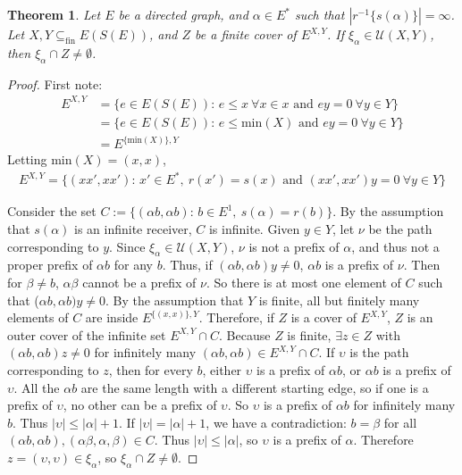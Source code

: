 \documentclass{article}
\newtheorem*{theorem}{Theorem}
\begin{document}
\begin{theorem} Let $E$ be a directed graph, and $\alpha \in E^*$ such that $|r^{-1}\{s(\alpha)\}| = \infty$.
    Let $X, Y \subseteq_{\text{fin}} E(S(E))$, and $Z$ be a finite cover of $E^{X, Y}$.
If $\xi_\alpha \in \mathcal{U}(X, Y)$, then $\xi_\alpha \cap Z \neq \emptyset$. \end{theorem}
\begin{proof}
    First note:
    \begin{align*}
        E^{X, Y} &= \{ e \in E(S(E))\text{: } e \leq x \ \forall x \in x \text{ and } ey = 0 \ \forall y \in Y \} \\
                 &= \{ e \in E(S(E))\text{: } e \leq \text{min}(X) \text{ and } ey = 0 \ \forall y \in Y \} \\
                 &= E^{\{\text{min}(X)\}, Y}
    \end{align*}
    Letting min$(X) = (x, x)$,
    \begin{align*}
        E^{X, Y} = \{ (xx', xx') \text{: } x' \in E^*, \ r(x') = s(x) \text{ and } (xx', xx')y = 0 \ \forall y \in Y \}
    \end{align*}

    Consider the set $C := \{ (\alpha b, \alpha b)\text{: } b \in E^1, \ s(\alpha) = r(b) \}$. By the assumption
    that $s(\alpha)$ is an infinite receiver, $C$ is infinite. Given $y \in Y$, let $\nu$ be the path corresponding to $y$.
    Since $\xi_\alpha \in \mathcal{U}(X, Y)$, $\nu$ is not a prefix of $\alpha$, and thus not a proper prefix of $\alpha b$ 
    for any $b$. Thus, if $(\alpha b, \alpha b)y \neq 0$, $\alpha b$ is a prefix of $\nu$. Then for $\beta \neq b$, 
    $\alpha \beta$ cannot be a prefix of $\nu$. So there is at most one element of $C$ such that ($\alpha b, \alpha b)y \neq 0$.
    By the assumption that $Y$ is finite, all but finitely many elements of $C$ are inside $E^{\{(x, x)\}, Y}$. Therefore, if $Z$
    is a cover of $E^{X, Y}$, $Z$ is an outer cover of the infinite set $E^{X, Y} \cap C$. Because $Z$ is finite, $\exists z \in Z$ 
    with $(\alpha b, \alpha b)z \neq 0$ for infinitely many $(\alpha b, \alpha b) \in E^{X, Y} \cap C$. If $\upsilon$ is the path corresponding to $z$,
    then for every $b$, either $\upsilon$ is a prefix of $\alpha b$, or $\alpha b$ is a prefix of $\upsilon$.
    All the $\alpha b$ are the same length with a different starting edge, so if one is a prefix of $\upsilon$,
    no other can be a prefix of $\upsilon$. So $\upsilon$ is a prefix of $\alpha b$ for infinitely many $b$. Thus $|\upsilon| \leq |\alpha| + 1$.
    If $|\upsilon| = |\alpha| + 1$, we have a contradiction: $b = \beta$ for all $(\alpha b, \alpha b), (\alpha \beta, \alpha, \beta) \in C$.
    Thus $|\upsilon| \leq |\alpha|$, so $\upsilon$ is a prefix of $\alpha$. Therefore $z = (\upsilon, \upsilon) \in \xi_\alpha$, so 
    $\xi_\alpha \cap Z \neq \emptyset$.
\end{proof}
\end{document}
